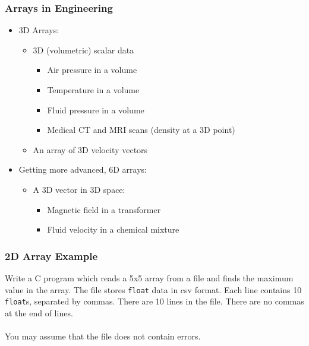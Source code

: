 \documentclass[14pt]{beamer}
\begin{document}
\begin{frame}
\frametitle{Arrays in Engineering}
\begin{itemize}
\item 3D Arrays:
	\begin{itemize}
		\item 3D (volumetric) scalar data
		\pause
		\begin{itemize}
			\item Air pressure in a volume
			\item Temperature in a volume
			\item Fluid pressure in a volume
			\item Medical CT and MRI scans (density at a 3D point)
		\end{itemize}
		\item An array of 3D velocity vectors
	\end{itemize}
\pause
\item Getting more advanced, 6D arrays:
\pause
	\begin{itemize}
		\item A 3D vector in 3D space:
		\pause
		\begin{itemize}
			\item Magnetic field in a transformer
			\item Fluid velocity in a chemical mixture
		\end{itemize}
	\end{itemize}
\end{itemize}
\end{frame}

\begin{frame}
\frametitle{2D Array Example}
Write a C program which reads a 5x5 array from a file and finds the maximum value in the array. The file stores \texttt{float} data in csv format. Each line contains 10 \texttt{float}s, separated by commas. There are 10 lines in the file. There are no commas at the end of lines.
\\~\\
You may assume that the file does not contain errors.
\end{frame}
\end{document}
